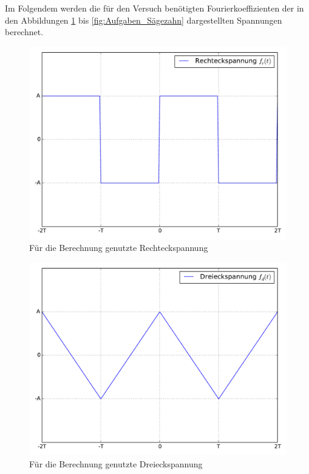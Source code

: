 Im Folgendem werden die für den Versuch benötigten Fourierkoeffizienten
der in den Abbildungen \ref{fig:Aufgaben_Rechteck} bis \ref{fig:Aufgaben_Sägezahn} dargestellten Spannungen 
berechnet.
	\begin{figure}[h!]
		\centering
		\includegraphics[scale=0.35]{Grafiken/RechteckSpannung.pdf}
		\caption{Für die Berechnung genutzte Rechteckspannung}
		\label{fig:Aufgaben_Rechteck}
	\end{figure}
	
	\begin{figure}[h!]
		\centering
		\includegraphics[scale=0.35]{Grafiken/DreieckSpannung.pdf}
		\caption{Für die Berechnung genutzte Dreieckspannung}
		\label{fig:Aufgaben_Dreieck}
	\end{figure}
	

